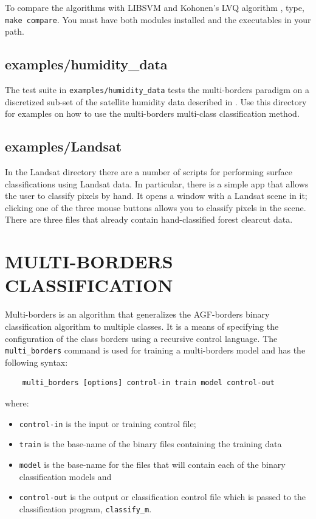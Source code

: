\documentclass[12pt]{article}
\begin{document}
  To compare the algorithms with LIBSVM \citep{Chang_Lin2011} and Kohonen's LVQ algorithm \citep{Kohonen2000}, type, \verb"make compare".  You must have both modules installed and the executables in your path.

\subsection{examples/humidity\_data}

The test suite in \verb"examples/humidity_data" tests the multi-borders paradigm on a discretized sub-set of the satellite humidity data described in \citet{Mills2009}.  Use this directory for examples on how to use the multi-borders multi-class classification method.

\subsection{examples/Landsat}

In the Landsat directory there are a number of scripts for performing surface classifications using Landsat data.  In particular, there is a simple app that allows the user to classify pixels by hand.  It opens a window with a Landsat scene in it; clicking one of the three mouse buttons allows you to classify pixels in the scene.  There are three files that already contain hand-classified forest clearcut data.


\section{MULTI-BORDERS CLASSIFICATION}

\label{MULTI_BORDERS_CLASSIFICATION}

  Multi-borders is an algorithm that generalizes the AGF-borders binary classification algorithm to multiple classes.  It is a means of specifying the configuration of the class borders using a recursive control language.  The \verb/multi_borders/ command is used for training a multi-borders model and has the following syntax:
\begin{verbatim}
    multi_borders [options] control-in train model control-out
\end{verbatim}
where:
\begin{itemize}
\item \verb$control-in$ is the input or training control file; 
\item \verb$train$ is the base-name of the binary files containing the training data
\item \verb$model$ is the base-name for the files that will contain each of the binary classification models and 
\item \verb$control-out$ is the output or classification control file which is passed to the classification program, \verb/classify_m/.
\end{itemize}
\end{document}
